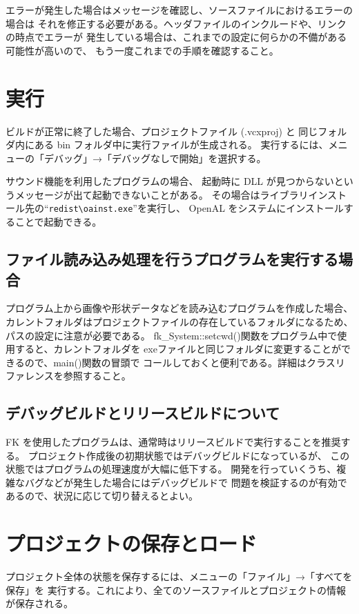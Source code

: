 \documentclass[a4j]{jarticle}
\begin{document}
エラーが発生した場合はメッセージを確認し、ソースファイルにおけるエラーの場合は
それを修正する必要がある。ヘッダファイルのインクルードや、リンクの時点でエラーが
発生している場合は、これまでの設定に何らかの不備がある可能性が高いので、
もう一度これまでの手順を確認すること。


\section{実行}
ビルドが正常に終了した場合、プロジェクトファイル (.vcxproj) と
同じフォルダ内にある bin フォルダ中に実行ファイルが生成される。
実行するには、メニューの「デバッグ」→「デバッグなしで開始」を選択する。

サウンド機能を利用したプログラムの場合、
起動時に DLL が見つからないというメッセージが出て起動できないことがある。
その場合はライブラリインストール先の``\verb+redist\oainst.exe+''を実行し、
OpenAL をシステムにインストールすることで起動できる。

\subsection{ファイル読み込み処理を行うプログラムを実行する場合}
プログラム上から画像や形状データなどを読み込むプログラムを作成した場合、
カレントフォルダはプロジェクトファイルの存在しているフォルダになるため、
パスの設定に注意が必要である。
fk\_System::setcwd()関数をプログラム中で使用すると、カレントフォルダを
exeファイルと同じフォルダに変更することができるので、main()関数の冒頭で
コールしておくと便利である。詳細はクラスリファレンスを参照すること。

\subsection{デバッグビルドとリリースビルドについて}
FK を使用したプログラムは、通常時はリリースビルドで実行することを推奨する。
プロジェクト作成後の初期状態ではデバッグビルドになっているが、
この状態ではプログラムの処理速度が大幅に低下する。
開発を行っていくうち、複雑なバグなどが発生した場合にはデバッグビルドで
問題を検証するのが有効であるので、状況に応じて切り替えるとよい。


\section{プロジェクトの保存とロード}
プロジェクト全体の状態を保存するには、メニューの「ファイル」→「すべてを保存」を
実行する。これにより、全てのソースファイルとプロジェクトの情報が保存される。
\end{document}
